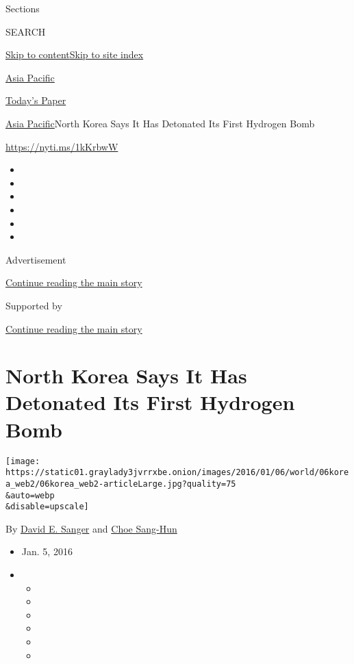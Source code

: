 Sections

SEARCH

\protect\hyperlink{site-content}{Skip to
content}\protect\hyperlink{site-index}{Skip to site index}

\href{https://www.nytimes3xbfgragh.onion/section/world/asia}{Asia
Pacific}

\href{https://myaccount.nytimes3xbfgragh.onion/auth/login?response_type=cookie\&client_id=vi}{}

\href{https://www.nytimes3xbfgragh.onion/section/todayspaper}{Today's
Paper}

\href{/section/world/asia}{Asia Pacific}\textbar{}North Korea Says It
Has Detonated Its First Hydrogen Bomb

\url{https://nyti.ms/1kKrbwW}

\begin{itemize}
\item
\item
\item
\item
\item
\item
\end{itemize}

Advertisement

\protect\hyperlink{after-top}{Continue reading the main story}

Supported by

\protect\hyperlink{after-sponsor}{Continue reading the main story}

\hypertarget{north-korea-says-it-has-detonated-its-first-hydrogen-bomb}{%
\section{North Korea Says It Has Detonated Its First Hydrogen
Bomb}\label{north-korea-says-it-has-detonated-its-first-hydrogen-bomb}}

\texttt{[image: https://static01.graylady3jvrrxbe.onion/images/2016/01/06/world/06korea\_web2/06korea\_web2-articleLarge.jpg?quality=75\\\&auto=webp\\\&disable=upscale]}

By \href{http://www.nytimes3xbfgragh.onion/by/david-e-sanger}{David E.
Sanger} and
\href{http://www.nytimes3xbfgragh.onion/by/choe-sang-hun}{Choe Sang-Hun}

\begin{itemize}
\item
  Jan. 5, 2016
\item
  \begin{itemize}
  \item
  \item
  \item
  \item
  \item
  \item
  \end{itemize}
\end{itemize}

